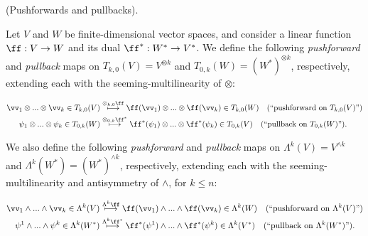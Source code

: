 \begin{defn}
\label{ch::exterior_pwrs::defn::pushforward_pullback}
    (Pushforwards and pullbacks).
    
    Let $V$ and $W$ be finite-dimensional vector spaces, and consider a linear function $\ff:V \rightarrow W$ and its dual ${\ff^*:W^* \rightarrow V^*}$. We define the following \textit{pushforward} and \textit{pullback} maps on ${T_{k,0}(V) = V^{\otimes k}}$ and ${T_{0,k}(W) = (W^*)^{\otimes k}}$, respectively, extending each with the seeming-multilinearity of $\otimes$:
    
    \begin{align*}
        \vv_1 \otimes ... \otimes \vv_k \in T_{k,0}(V) &\overset{\otimes_{k, 0} \ff}{\longmapsto} \ff(\vv_1) \otimes ... \otimes \ff(\vv_k) \in T_{k,0}(W) \quad \text{(``pushforward on $T_{k,0}(V)$'')} \\
        \psi_1 \otimes ... \otimes \psi_k \in T_{0,k}(W) &\overset{\otimes_{0, k} \ff^*}{\longmapsto} \ff^*(\psi_1) \otimes ... \otimes \ff^*(\psi_k) \in T_{0,k}(V) \quad \text{(``pullback on $T_{0,k}(W)$'')}.
    \end{align*}
    
    We also define the following \textit{pushforward} and \textit{pullback} maps on $\Lambda^k(V) = V^{\wedge k}$ and $\Lambda^k(W^*) = (W^*)^{\wedge k}$, respectively, extending each with the seeming-multilinearity and antisymmetry of $\wedge$, for $k \leq n$:
    
    \begin{align*}
        \vv_1 \wedge ... \wedge \vv_k \in \Lambda^k(V) &\overset{\Lambda^k \ff}{\longmapsto} \ff(\vv_1) \wedge ... \wedge \ff(\vv_k) \in \Lambda^k(W) \quad \text{(``pushforward on $\Lambda^k(V)$'')} \\
        \psi^1 \wedge ... \wedge \psi^k \in \Lambda^k(W^*) &\overset{\Lambda^k \ff^*}{\longmapsto} \ff^*(\psi^1) \wedge ... \wedge \ff^*(\psi^k) \in \Lambda^k(V^*) \quad \text{(``pullback on $\Lambda^k(W^*)$'')}.
    \end{align*}
\end{defn}

